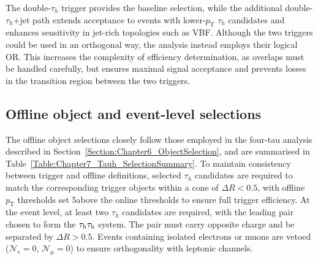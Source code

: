 The double-$\tau_h$ trigger provides the baseline selection, while the additional double-$\tau_h$+jet path extends acceptance to events with lower-$p_\text{T}$ $\tau_h$ candidates and enhances sensitivity in jet-rich topologies such as \ac{VBF}. Although the two triggers could be used in an orthogonal way, the analysis instead employs their logical OR. This increases the complexity of efficiency determination, as overlaps must be handled carefully, but ensures maximal signal acceptance and prevents losses in the transition region between the two triggers. 

\subsection{Offline object and event-level selections}
\label{Section:Chapter7_OfflineSelections}
The offline object selections closely follow those employed in the four-tau analysis described in Section~\ref{Section:Chapter6_ObjectSelection}, and are summarised in Table~\ref{Table:Chapter7_Tauh_SelectionSummary}. To maintain consistency between trigger and offline definitions, selected $\tau_h$ candidates are required to match the corresponding trigger objects within a cone of $\Delta R < 0.5$, with offline $p_\text{T}$ thresholds set 5\GeV above the online thresholds to ensure full trigger efficiency. At the event level, at least two $\tau_h$ candidates are required, with the leading pair chosen to form the $\tau_\mathrm{h}\tau_\mathrm{h}$ system. The pair must carry opposite charge and be separated by $\Delta R > 0.5$. Events containing isolated electrons or muons are vetoed ($\mathcal{N}_e = 0$, $\mathcal{N}_\mu = 0$) to ensure orthogonality with leptonic channels. 


